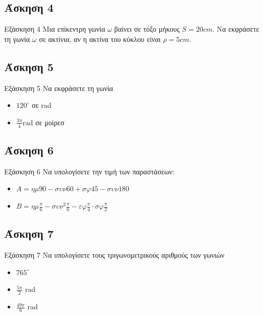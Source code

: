 \documentclass[greek]{beamer}
\begin{document}
\subsection{Άσκηση 4}
\begin{frame}[label=Άσκηση4]{Εξάσκηση 4}
 Μια επίκεντρη γωνία $ω$ βαίνει σε τόξο μήκους $S=20cm$. Να εκφράσετε τη γωνία $ω$ σε ακτίνια, αν η ακτίνα του κύκλου είναι $ρ=5cm$.

\end{frame}

\subsection{Άσκηση 5}
\begin{frame}[label=Άσκηση5]{Εξάσκηση 5}
 Να εκφράσετε τη γωνία
 \begin{itemize}
  \item<1-> $120^{\circ}$ σε rad
  \item<2-> $\frac{3π}{4}$rad σε μοίρεσ
 \end{itemize}

\end{frame}

\subsection{Άσκηση 6}
\begin{frame}[label=Άσκηση6]{Εξάσκηση 6}
 Να υπολογίσετε την τιμή των παραστάσεων:
 \begin{itemize}
  \item<1-> $Α=ημ90-συν60+σφ45-συν180$
  \item<2-> $Β=ημ\frac{π}{6}-συν^2\frac{π}{6}-εφ\frac{π}{4}\cdot σφ\frac{π}{2}$
 \end{itemize}

\end{frame}

\subsection{Άσκηση 7}
\begin{frame}[label=Άσκηση]{Εξάσκηση 7}
 Να υπολογίσετε τους τριγωνομετρικούς αριθμούς των γωνιών
 \begin{itemize}
  \item<1-> $765^{\circ}$
  \item<2-> $\frac{5π}{2}$ rad
  \item<3-> $\frac{49π}{6}$ rad
 \end{itemize}

\end{frame}
\end{document}
